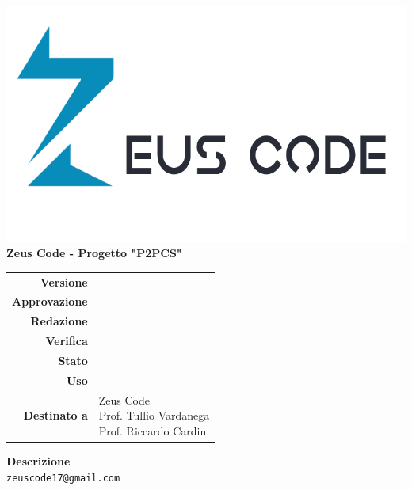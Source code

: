 \thispagestyle{empty}
\begin{titlepage}
	\begin{center}
		\includegraphics[scale = 0.3]{res/images/zeus_code_logo.png}\\
		\large \textbf{Zeus Code - Progetto "P2PCS"} \\
		\vfill
		\Huge \textbf{\doctitle}
		\vspace*{\fill}
		
		\vfill
		\large
		\begin{tabular}{r|l}
			\textbf{Versione} & \rev{} \\
			\textbf{Approvazione} & \approv{} \\
			\textbf{Redazione} & \red{} \\
			\textbf{Verifica} & \ver{} \\
			\textbf{Stato} & \stato{} \\
			\textbf{Uso} & \uso{} \\
			\textbf{Destinato a} & \parbox[t]{5cm}{Zeus Code
				\\Prof. Tullio Vardanega\\Prof. Riccardo Cardin}
		\end{tabular}
		\vfill
		\normalsize
		\textbf{Descrizione}\\
		\describedoc
		\vfill
		\small
		\texttt{zeuscode17@gmail.com}
	\end{center}
\end{titlepage}